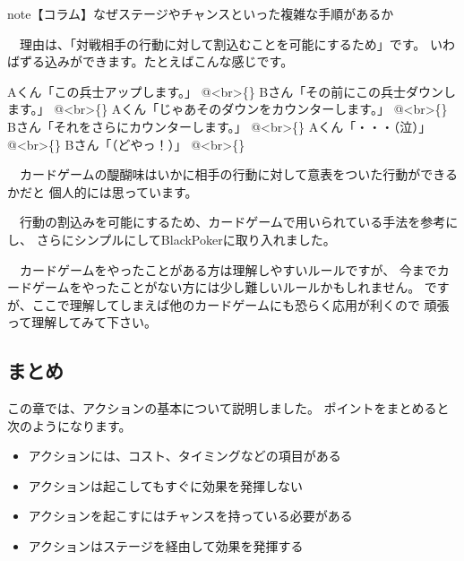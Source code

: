 \documentclass[letterpaper,10pt,dvipdfmx]{sphinxmanual}
\begin{document}
\begin{sphinxadmonition}{note}{【コラム】なぜステージやチャンスといった複雑な手順があるか}

　理由は、「対戦相手の行動に対して割込むことを可能にするため」です。
いわばずる込みができます。たとえばこんな感じです。

Aくん「この兵士アップします。」 @\textless{}br\textgreater{}\{\}
Bさん「その前にこの兵士ダウンします。」 @\textless{}br\textgreater{}\{\}
Aくん「じゃあそのダウンをカウンターします。」 @\textless{}br\textgreater{}\{\}
Bさん「それをさらにカウンターします。」 @\textless{}br\textgreater{}\{\}
Aくん「・・・（泣）」 @\textless{}br\textgreater{}\{\}
Bさん「（どやっ！）」 @\textless{}br\textgreater{}\{\}

　カードゲームの醍醐味はいかに相手の行動に対して意表をついた行動ができるかだと
個人的には思っています。

　行動の割込みを可能にするため、カードゲームで用いられている手法を参考にし、
さらにシンプルにしてBlackPokerに取り入れました。

　カードゲームをやったことがある方は理解しやすいルールですが、
今までカードゲームをやったことがない方には少し難しいルールかもしれません。
ですが、ここで理解してしまえば他のカードゲームにも恐らく応用が利くので
頑張って理解してみて下さい。
\end{sphinxadmonition}


\subsection{まとめ}
\label{\detokenize{common/03-action:id31}}
この章では、アクションの基本について説明しました。
ポイントをまとめると次のようになります。
\begin{itemize}
\item {} 
アクションには、コスト、タイミングなどの項目がある

\item {} 
アクションは起こしてもすぐに効果を発揮しない

\item {} 
アクションを起こすにはチャンスを持っている必要がある

\item {} 
アクションはステージを経由して効果を発揮する

\end{itemize}
\end{document}
